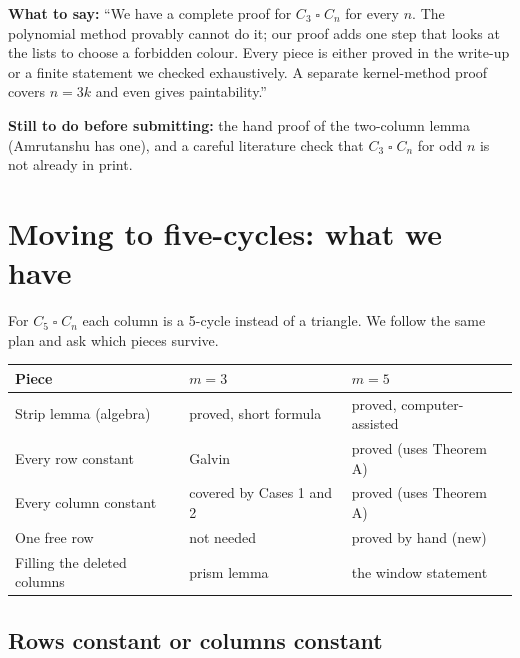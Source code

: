 \documentclass[11pt,oneside,openany]{book}
\newcommand{\T}{\mathbin{\square}}
\begin{document}
\begin{meeting}
\textbf{What to say:} ``We have a complete proof for $C_3 \T C_n$ for every $n$. The polynomial
method provably cannot do it; our proof adds one step that looks at the lists to choose a
forbidden colour. Every piece is either proved in the write-up or a finite statement we checked
exhaustively. A separate kernel-method proof covers $n = 3k$ and even gives paintability.''

\textbf{Still to do before submitting:} the hand proof of the two-column lemma (Amrutanshu has
one), and a careful literature check that $C_3 \T C_n$ for odd $n$ is not already in print.
\end{meeting}

\chapter{Moving to five-cycles: what we have}

For $C_5 \T C_n$ each column is a 5-cycle instead of a triangle. We follow the same plan and ask
which pieces survive.

\begin{center}
\renewcommand{\arraystretch}{1.3}
\begin{tabular}{p{5.3cm}p{3.6cm}p{4.6cm}}
\toprule
Piece & $m = 3$ & $m = 5$ \\
\midrule
Strip lemma (algebra) & \cellcolor{provedc!15}proved, short formula & \cellcolor{provedc!15}proved, computer-assisted \\
Every row constant & \cellcolor{provedc!15}Galvin & \cellcolor{provedc!15}proved (uses Theorem A) \\
Every column constant & \cellcolor{provedc!15}covered by Cases 1 and 2 & \cellcolor{provedc!15}proved (uses Theorem A) \\
One free row & not needed & \cellcolor{provedc!15}proved by hand (new) \\
Filling the deleted columns & \cellcolor{provedc!15}prism lemma & \cellcolor{openc!12}the window statement \\
\bottomrule
\end{tabular}
\end{center}

\section{Rows constant or columns constant}
\end{document}
